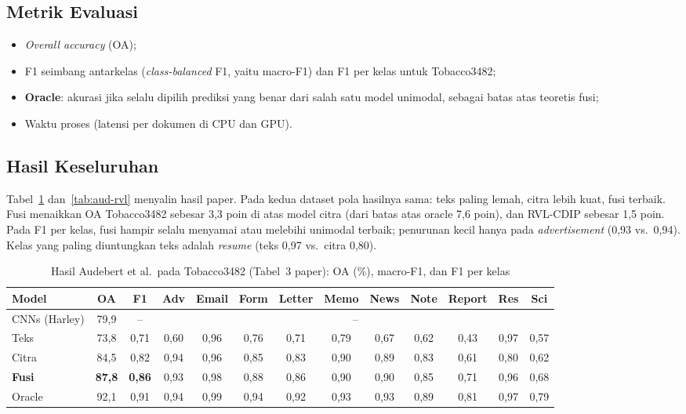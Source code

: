 \subsection{Metrik Evaluasi}
\begin{itemize}
  \item \emph{Overall accuracy} (OA);
  \item F1 seimbang antarkelas (\emph{class-balanced} F1, yaitu macro-F1) dan F1 per kelas
        untuk Tobacco3482;
  \item \textbf{Oracle}: akurasi jika selalu dipilih prediksi yang benar dari salah satu
        model unimodal, sebagai batas atas teoretis fusi;
  \item Waktu proses (latensi per dokumen di CPU dan GPU).
\end{itemize}

\subsection{Hasil Keseluruhan}
Tabel~\ref{tab:aud-tob} dan~\ref{tab:aud-rvl} menyalin hasil paper. Pada kedua dataset
pola hasilnya sama: teks paling lemah, citra lebih kuat, fusi terbaik. Fusi menaikkan OA
Tobacco3482 sebesar 3,3 poin di atas model citra (dari batas atas oracle 7,6 poin), dan
RVL-CDIP sebesar 1,5 poin. Pada F1 per kelas, fusi hampir selalu menyamai atau melebihi
unimodal terbaik; penurunan kecil hanya pada \emph{advertisement} (0,93 vs.\ 0,94).
Kelas yang paling diuntungkan teks adalah \emph{resume} (teks 0,97 vs.\ citra 0,80).

\begin{table}[H]
  \centering
  \caption{Hasil Audebert et al.\ pada Tobacco3482 (Tabel~3 paper): OA (\%), macro-F1, dan F1 per kelas}
  \label{tab:aud-tob}
  \fontsize{9}{11}\selectfont
  \setlength\tabcolsep{3pt}
  \begin{tabular}{|l|c|c|c|c|c|c|c|c|c|c|c|c|}
    \hline
    \textbf{Model} & \textbf{OA} & \textbf{F1} & Adv & Email & Form & Letter & Memo & News & Note & Report & Res & Sci \\ \hline
    CNNs (Harley) & 79,9 & -- & \multicolumn{10}{c|}{--} \\ \hline
    Teks   & 73,8 & 0,71 & 0,60 & 0,96 & 0,76 & 0,71 & 0,79 & 0,67 & 0,62 & 0,43 & 0,97 & 0,57 \\ \hline
    Citra  & 84,5 & 0,82 & 0,94 & 0,96 & 0,85 & 0,83 & 0,90 & 0,89 & 0,83 & 0,61 & 0,80 & 0,62 \\ \hline
    \textbf{Fusi} & \textbf{87,8} & \textbf{0,86} & 0,93 & 0,98 & 0,88 & 0,86 & 0,90 & 0,90 & 0,85 & 0,71 & 0,96 & 0,68 \\ \hline
    Oracle & 92,1 & 0,91 & 0,94 & 0,99 & 0,94 & 0,92 & 0,93 & 0,93 & 0,89 & 0,81 & 0,97 & 0,79 \\ \hline
  \end{tabular}
\end{table}

